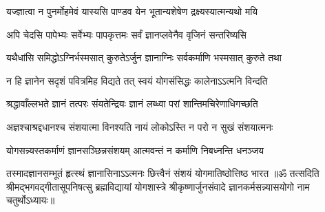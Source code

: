 \twolineshloka
{यज्ज्ञात्वा न पुनर्मोहमेवं यास्यसि पाण्डव}
{येन भूतान्यशेषेण द्रक्ष्यस्यात्मन्यथो मयि}%

\twolineshloka
{अपि चेदसि पापेभ्यः सर्वेभ्यः पापकृत्तमः}
{सर्वं ज्ञानप्लवेनैव वृजिनं सन्तरिष्यसि}%

\twolineshloka
{यथैधांसि समिद्धोऽग्निर्भस्मसात् कुरुतेऽर्जुन}
{ज्ञानाग्निः सर्वकर्माणि भस्मसात् कुरुते तथा}%

\twolineshloka
{न हि ज्ञानेन सदृशं पवित्रमिह विद्यते}
{तत् स्वयं योगसंसिद्धः कालेनाऽऽत्मनि विन्दति}%

\twolineshloka
{श्रद्धावाँल्लभते ज्ञानं तत्परः संयतेन्द्रियः}
{ज्ञानं लब्ध्वा परां शान्तिमचिरेणाधिगच्छति}%

\twolineshloka
{अज्ञश्चाश्रद्दधानश्च संशयात्मा विनश्यति}
{नायं लोकोऽस्ति न परो न सुखं संशयात्मनः}%

\twolineshloka
{योगसन्न्यस्तकर्माणं ज्ञानसञ्छिन्नसंशयम्}
{आत्मवन्तं न कर्माणि निबध्नन्ति धनञ्जय}%

\twolineshloka
{तस्मादज्ञानसम्भूतं हृत्स्थं ज्ञानासिनाऽऽत्मनः}
{छित्त्वैनं संशयं योगमातिष्ठोत्तिष्ठ भारत}%
{॥ॐ तत्सदिति श्रीमद्भगवद्गीतासूपनिषत्सु ब्रह्मविद्यायां योगशास्त्रे श्रीकृष्णार्जुनसंवादे ज्ञानकर्मसन्न्यासयोगो नाम चतुर्थोऽध्यायः॥}

